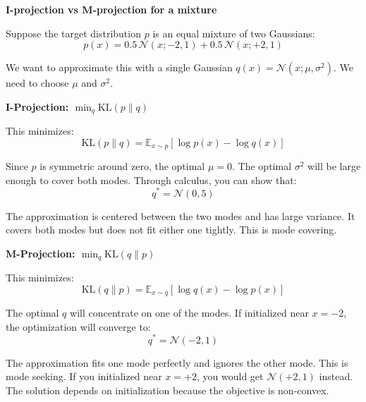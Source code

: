 \begin{examplebox}
\textbf{I-projection vs M-projection for a mixture}

\vspace{0.5em}

Suppose the target distribution $p$ is an equal mixture of two Gaussians:
\begin{equation*}
p(x) = 0.5 \, \mathcal{N}(x; -2, 1) + 0.5 \, \mathcal{N}(x; +2, 1)
\end{equation*}

We want to approximate this with a single Gaussian $q(x) = \mathcal{N}(x; \mu, \sigma^2)$. We need to choose $\mu$ and $\sigma^2$.

\vspace{0.5em}

\textbf{I-Projection: $\min_q \text{KL}(p \| q)$}

This minimizes:
\begin{equation*}
\text{KL}(p \| q) = \mathbb{E}_{x \sim p}[\log p(x) - \log q(x)]
\end{equation*}

Since $p$ is symmetric around zero, the optimal $\mu = 0$. The optimal $\sigma^2$ will be large enough to cover both modes. Through calculus, you can show that:
\begin{equation*}
q^* = \mathcal{N}(0, 5)
\end{equation*}

The approximation is centered between the two modes and has large variance. It covers both modes but does not fit either one tightly. This is mode covering.

\vspace{0.5em}

\textbf{M-Projection: $\min_q \text{KL}(q \| p)$}

This minimizes:
\begin{equation*}
\text{KL}(q \| p) = \mathbb{E}_{x \sim q}[\log q(x) - \log p(x)]
\end{equation*}

The optimal $q$ will concentrate on one of the modes. If initialized near $x = -2$, the optimization will converge to:
\begin{equation*}
q^* = \mathcal{N}(-2, 1)
\end{equation*}

The approximation fits one mode perfectly and ignores the other mode. This is mode seeking. If you initialized near $x = +2$, you would get $\mathcal{N}(+2, 1)$ instead. The solution depends on initialization because the objective is non-convex.


\end{examplebox}

